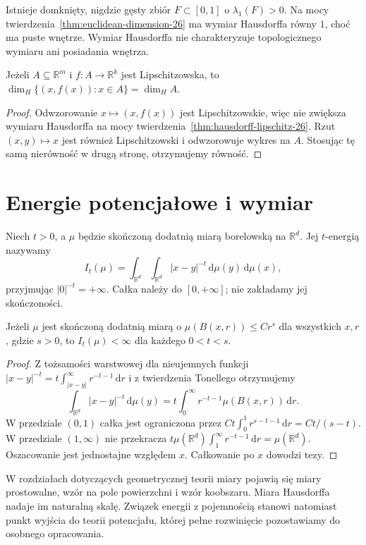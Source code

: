 \begin{przyklad}
Istnieje domknięty, nigdzie gęsty zbiór
$F\subset[0,1]$ o $\lambda_1(F)>0$.
Na mocy twierdzenia~\ref{thm:euclidean-dimension-26}
ma wymiar Hausdorffa równy $1$, choć ma puste wnętrze.
Wymiar Hausdorffa nie charakteryzuje topologicznego
wymiaru ani posiadania wnętrza.
\end{przyklad}

\begin{wniosek}
\label{cor:graph-dimension-26}
Jeżeli $A\subseteq\mathbb R^m$ i
$f:A\to\mathbb R^k$ jest Lipschitzowska, to
$\dim_H\{(x,f(x)):x\in A\}=\dim_HA$.
\end{wniosek}
\begin{proof}
Odwzorowanie $x\mapsto(x,f(x))$ jest Lipschitzowskie,
więc nie zwiększa wymiaru Hausdorffa na mocy
twierdzenia~\ref{thm:hausdorff-lipschitz-26}.
Rzut $(x,y)\mapsto x$ jest również Lipschitzowski
i odwzorowuje wykres na $A$. Stosując tę samą
nierówność w drugą stronę, otrzymujemy równość.
\end{proof}

\section{Energie potencjałowe i wymiar}
\begin{definicja}
\label{def:energy-26}
Niech $t>0$, a $\mu$ będzie skończoną dodatnią miarą
borelowską na $\mathbb R^d$. Jej $t$-energią nazywamy
\[
 I_t(\mu)=\int_{\mathbb R^d}\!\int_{\mathbb R^d}
 |x-y|^{-t}\,\mathrm d\mu(y)\,\mathrm d\mu(x),
\]
przyjmując $|0|^{-t}=+\infty$. Całka należy do
$[0,+\infty]$; nie zakładamy jej skończoności.
\end{definicja}

\begin{twierdzenie}
\label{thm:frostman-energy-26}
Jeżeli $\mu$ jest skończoną dodatnią miarą o
$\mu(B(x,r))\le Cr^s$ dla wszystkich $x,r$,
gdzie $s>0$, to $I_t(\mu)<\infty$ dla każdego
$0<t<s$.
\end{twierdzenie}
\begin{proof}
Z tożsamości warstwowej dla nieujemnych funkcji
$|x-y|^{-t}=t\int_{|x-y|}^{\infty}r^{-t-1}\,\mathrm dr$
i z twierdzenia Tonellego otrzymujemy
\[
 \int_{\mathbb R^d}|x-y|^{-t}\,\mathrm d\mu(y)
 =t\int_0^\infty r^{-t-1}\mu(B(x,r))\,\mathrm dr.
\]
W przedziale $(0,1)$ całka jest ograniczona przez
$Ct\int_0^1r^{s-t-1}\,\mathrm dr=Ct/(s-t)$.
W przedziale $(1,\infty)$ nie przekracza
$t\mu(\mathbb R^d)\int_1^\infty r^{-t-1}\,\mathrm dr
=\mu(\mathbb R^d)$. Oszacowanie jest jednostajne
względem $x$. Całkowanie po $x$ dowodzi tezy.
\end{proof}

\begin{uwaga}
W rozdziałach dotyczących geometrycznej teorii miary
pojawią się miary prostowalne, wzór na pole powierzchni
i wzór koobszaru. Miara Hausdorffa nadaje im naturalną
skalę. Związek energii z pojemnością stanowi natomiast
punkt wyjścia do teorii potencjału, której pełne
rozwinięcie pozostawiamy do osobnego opracowania.
\end{uwaga}
